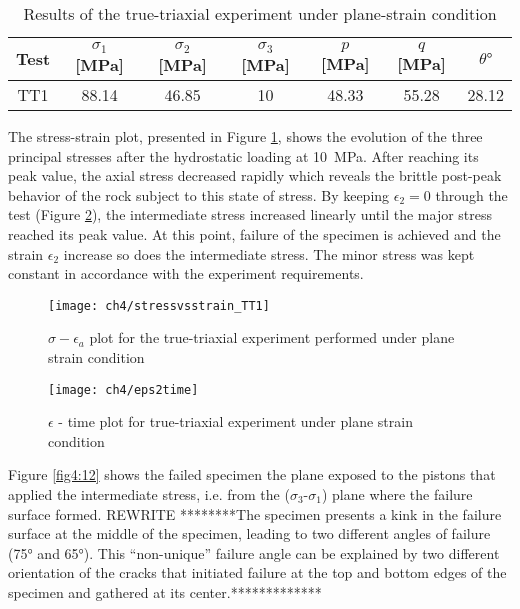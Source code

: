 \begin{table}
    \centering
    \begin{tabular}{ccccccc}
        \hline
        Test & $\sigma_1$ [\si{MPa}] & $\sigma_2$ [\si{MPa}] & $\sigma_3$ [\si{MPa}] & $p$ [\si{MPa}] & $q$ [\si{MPa}] & $\theta \si{\degree}$ \\
        \hline
        \hline
        TT1 &88.14 & 46.85 & 10 & 48.33 & 55.28 & 28.12 \\
        \hline
    \end{tabular}
    \caption{Results of the true-triaxial experiment under plane-strain condition}
    \label{tb4:TT1}
\end{table}

The stress-strain plot, presented in Figure \ref{fig4:10}, shows the evolution of the three principal stresses after the hydrostatic loading at \SI{10}{MPa}. After reaching its peak value, the axial stress decreased rapidly which reveals the brittle post-peak behavior of the rock subject to this state of stress.  By keeping $\epsilon_2 = 0$  through the test (Figure \ref{fig4:11}), the intermediate stress increased linearly until the major stress reached its peak value. At this point, failure of the specimen is achieved and the strain $\epsilon_2$ increase so does the intermediate stress. The minor stress was kept constant in accordance with the experiment requirements.

\begin{figure}[tb]
    \centering
    \texttt{[image: ch4/stressvsstrain\_TT1]}
    \caption{$\sigma-\epsilon_a$ plot for the true-triaxial experiment performed under plane strain condition}
    \label{fig4:10}
\end{figure} 


\begin{figure}[tb]
    \centering
    \texttt{[image: ch4/eps2time]}
    \caption{$\epsilon$ - time plot for true-triaxial experiment under plane strain condition}
    \label{fig4:11}
\end{figure} 

Figure \ref{fig4:12} shows the failed specimen the plane exposed to the pistons that applied the intermediate stress, i.e. from the ($\sigma_3$-$\sigma_1$) plane where the failure surface formed. REWRITE ********The specimen presents a kink in the failure surface at the middle of the specimen, leading to two different angles of failure (\ang{75} and \ang{65}). This “non-unique” failure angle can be explained by two different orientation of the cracks that initiated failure at the top and bottom edges of the specimen and gathered at its center.*************

